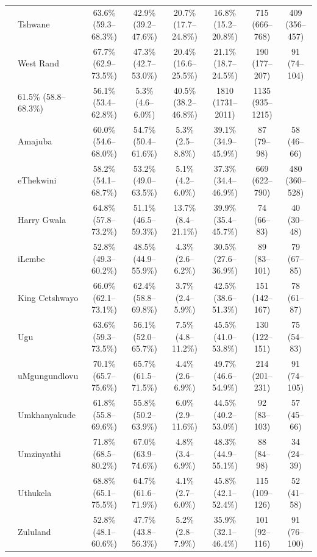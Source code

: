 \documentclass{article}
\begin{document}
\begin{landscape}
{\begin{longtable}[c]{llc cc ccc}
      & Tshwane & 63.6\% (59.3--68.3\%) & 42.9\% (39.2--47.6\%) & 20.7\% (17.7--24.8\%) & 16.8\% (15.2--20.8\%) & 715 (666--768) & 409 (356--457) \\
      & West Rand & 67.7\% (62.9--73.5\%) & 47.3\% (42.7--53.0\%) & 20.4\% (16.6--25.5\%) & 21.1\% (18.7--24.5\%) & 190 (177--207) & 91 (74--104) \\
      \pagebreak
      \multicolumn{2}{l}{\textbf{KwaZulu-Natal}} & 61.5\% (58.8--68.3\%) & 56.1\% (53.4--62.8\%) & 5.3\% (4.6--6.0\%) & 40.5\% (38.2--46.8\%) & 1810 (1731--2011) & 1135 (935--1215) \\
      & Amajuba & 60.0\% (54.6--68.0\%) & 54.7\% (50.4--61.6\%) & 5.3\% (2.5--8.8\%) & 39.1\% (34.9--45.9\%) & 87 (79--98) & 58 (46--66) \\
      & eThekwini & 58.2\% (54.1--68.7\%) & 53.2\% (49.0--63.5\%) & 5.1\% (4.2--6.0\%) & 37.3\% (34.4--46.9\%) & 669 (622--790) & 480 (360--528) \\
      & Harry Gwala & 64.8\% (57.8--73.2\%) & 51.1\% (46.5--59.3\%) & 13.7\% (8.4--21.1\%) & 39.9\% (35.4--45.7\%) & 74 (66--83) & 40 (30--48) \\
      & iLembe & 52.8\% (49.3--60.2\%) & 48.5\% (44.9--55.9\%) & 4.3\% (2.6--6.2\%) & 30.5\% (27.6--36.9\%) & 89 (83--101) & 79 (67--85) \\
      & King Cetshwayo & 66.0\% (62.1--73.1\%) & 62.4\% (58.8--69.8\%) & 3.7\% (2.4--5.9\%) & 42.5\% (38.6--51.3\%) & 151 (142--167) & 78 (61--87) \\
      & Ugu & 63.6\% (59.3--73.5\%) & 56.1\% (52.0--65.7\%) & 7.5\% (4.8--11.2\%) & 45.5\% (41.0--53.8\%) & 130 (122--151) & 75 (54--83) \\
      & uMgungundlovu & 70.1\% (65.7--75.6\%) & 65.7\% (61.5--71.5\%) & 4.4\% (2.6--6.9\%) & 49.7\% (46.6--54.9\%) & 214 (201--231) & 91 (74--105) \\
      & Umkhanyakude & 61.8\% (55.8--69.6\%) & 55.8\% (50.2--63.9\%) & 6.0\% (2.9--11.6\%) & 44.5\% (40.2--53.0\%) & 92 (83--103) & 57 (45--66) \\
      & Umzinyathi & 71.8\% (68.5--80.2\%) & 67.0\% (63.9--74.6\%) & 4.8\% (3.4--6.9\%) & 48.3\% (44.9--55.1\%) & 88 (84--98) & 34 (24--39) \\
      & Uthukela & 68.8\% (65.1--75.5\%) & 64.7\% (61.6--71.9\%) & 4.1\% (2.7--6.0\%) & 45.8\% (42.1--52.4\%) & 115 (109--126) & 52 (41--58) \\
      & Zululand & 52.8\% (48.1--60.6\%) & 47.7\% (43.8--56.3\%) & 5.2\% (2.8--7.9\%) & 35.9\% (32.1--46.4\%) & 101 (92--116) & 91 (76--100) \\[5pt]

\end{longtable}}
\end{landscape}
\end{document}
